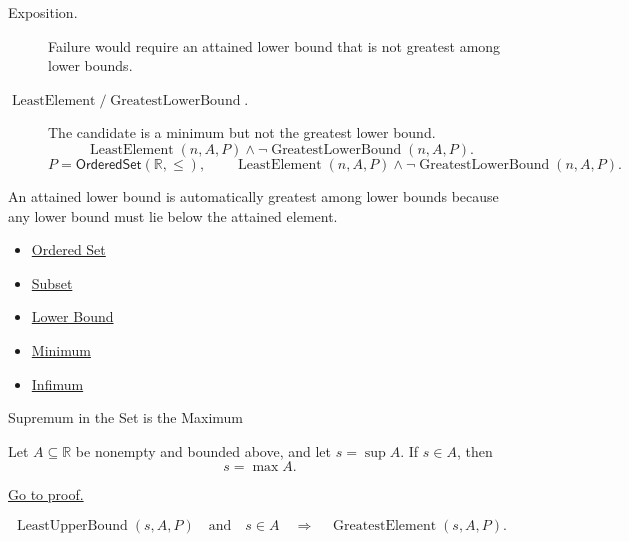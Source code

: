 \begin{remark*}
\begin{description}
  \item[Exposition.]
  Failure would require an attained lower bound that is not greatest among
  lower bounds.

  \item[\(\operatorname{LeastElement} / \operatorname{GreatestLowerBound}.\)]
  The candidate is a minimum but not the greatest lower bound.
  \[
    \operatorname{LeastElement}(n,A,P)\land
    \neg\operatorname{GreatestLowerBound}(n,A,P).
  \]
  \[
    P=\mathsf{OrderedSet}(\mathbb{R},\leq),\qquad
    \operatorname{LeastElement}(n,A,P)\land
    \neg\operatorname{GreatestLowerBound}(n,A,P).
  \]
\end{description}
\end{remark*}

\begin{remark*}[Interpretation]
An attained lower bound is automatically greatest among lower bounds because
any lower bound must lie below the attained element.
\end{remark*}

\begin{dependencies}
\begin{itemize}
  \item \hyperref[def:ordered-set]{Ordered Set}
  \item \hyperref[def:subset]{Subset}
  \item \hyperref[def:real-lower-bound]{Lower Bound}
  \item \hyperref[def:minimum]{Minimum}
  \item \hyperref[def:infimum]{Infimum}
\end{itemize}
\end{dependencies}

\begin{propositionbox}{Supremum in the Set is the Maximum}
\begin{proposition}
\label{prop:supremum-in-the-set-is-the-maximum}
Let $A\subseteq\mathbb{R}$ be nonempty and bounded above, and let
$s=\sup A$. If $s\in A$, then
\[
  s=\max A.
\]

\hyperref[prf:supremum-in-the-set-is-the-maximum]{Go to proof.}
\end{proposition}
\end{propositionbox}

\begin{remark*}
\[
  \operatorname{LeastUpperBound}(s,A,P)
  \quad\text{and}\quad
  s\in A
  \quad\Longrightarrow\quad
  \operatorname{GreatestElement}(s,A,P).
\]
\end{remark*}

